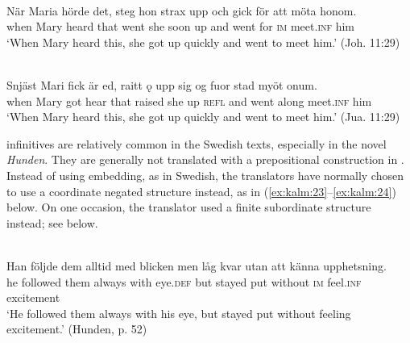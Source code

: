 \documentclass[output=paper]{langscibook}
\begin{document}
\ea
\label{ex:kalm:22}
\ea {}\label{ex:kalm:22a}\\
\gll När Maria hörde det, steg hon strax upp och gick för att möta honom.\\
when Mary heard that went she soon up and went for \textsc{im} meet.\textsc{inf} him\\
\glt ‘When Mary heard this, she got up quickly and went to meet him.’ (Joh. 11:29)

\ex {}\label{ex:kalm:22b}\\ 
\gll Snjäst Mari fick är ed, raitt ǫ upp sig og fuor stad myöt onum.\\
when Mary got hear that raised she up \textsc{refl} and went along meet.\textsc{inf} him\\
\glt ‘When Mary heard this, she got up quickly and went to meet him.’ (Jua. 11:29)
\z 
\z 


 infinitives are relatively common in the Swedish texts, especially in the novel \textit{Hunden}. They are generally not translated with a prepositional construction in . Instead of using embedding, as in Swedish, the  translators have normally chosen to use a coordinate negated structure instead, as in (\ref{ex:kalm:23}--\ref{ex:kalm:24}) below. On one occasion, the translator used a finite subordinate structure instead; see  below.\largerpage[-1]


\ea
\label{ex:kalm:23}
\ea {}\label{ex:kalm:23a}\\
\gll Han följde dem alltid med blicken men låg kvar utan att känna upphetsning.\\
he followed them always with eye.\textsc{def} but stayed put without \textsc{im} feel.\textsc{inf} excitement\\
\glt ‘He followed them always with his eye, but stayed put without feeling excitement.’ (Hunden, p. 52)\\
\end{document}
